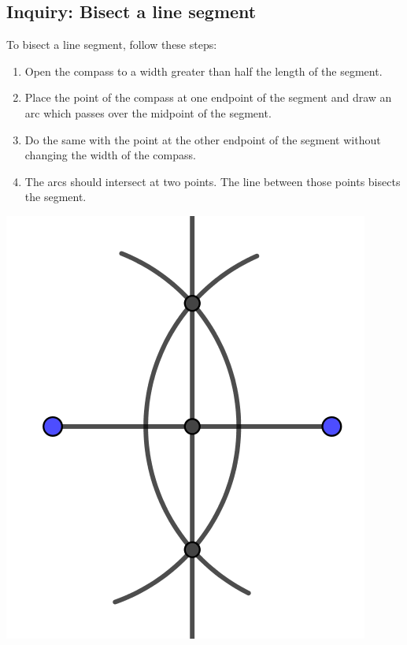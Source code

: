 \documentclass[11pt]{article}
\newenvironment{task}
	{\begin{mdframed}[linecolor=lightgray, linewidth=3pt]\raggedright}
	{\end{mdframed}}
\theoremstyle{definition}
\begin{document}
\subsection{Inquiry: Bisect a line segment}
\begin{task}
  To bisect a line segment, follow these steps:
  \begin{enumerate}
    \item Open the compass to a width greater than half the length of the segment.
    \item Place the point of the compass at one endpoint of the segment and draw an arc which passes over the midpoint of the segment.
    \item Do the same with the point at the other endpoint of the segment without changing the width of the compass.
    \item The arcs should intersect at two points. The line between those points bisects the segment. 
  \end{enumerate}
  \begin{center}
    \includegraphics[scale=.75]{Images/bisect_segment.png}
  \end{center}
\end{task}
\end{document}
